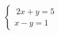 \documentclass[preview]{standalone}
\begin{document}
\begin{align*}
\left\{ \begin{array}{cl} \ 2x + y = 5 \\[1pt] x - y = 1 \end{array} \right.
\end{align*}
\end{document}
